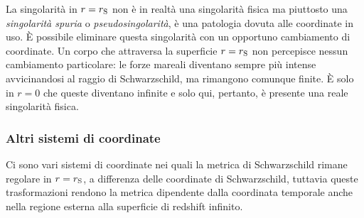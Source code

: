 La singolarità in \(r = r_{\textup{S}}\) non è in realtà una singolarità fisica
ma piuttosto una \emph{singolarità spuria} o \emph{pseudosingolarità}, è una
patologia dovuta alle coordinate in uso.  È possibile eliminare questa
singolarità con un opportuno cambiamento di coordinate.  Un corpo che attraversa
la superficie \(r = r_{\textup{S}}\) non percepisce nessun cambiamento
particolare: le forze mareali diventano sempre più intense avvicinandosi al
raggio di Schwarzschild, ma rimangono comunque finite.  È solo in \(r = 0\) che
queste diventano infinite e solo qui, pertanto, è presente una reale singolarità
fisica.

\subsubsection{Altri sistemi di coordinate}
\label{sec:altre-coordinate}

Ci sono vari sistemi di coordinate nei quali la metrica di Schwarzschild rimane
regolare in \(r = r_{\textup{S}}\), a differenza delle coordinate di
Schwarzschild, tuttavia queste trasformazioni rendono la metrica dipendente
dalla coordinata temporale anche nella regione esterna alla superficie di
redshift infinito.

